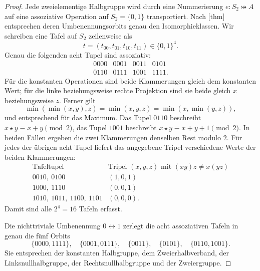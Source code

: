 \documentclass[main.tex]{subfiles}
\begin{document}
\begin{proof}
Jede zweielementige Halbgruppe wird durch eine Nummerierung
\(e\colon S_2\bij A\) auf eine assoziative Operation auf
\(S_2=\{0,1\}\) transportiert.  Nach
[thm]
entsprechen deren Umbenennungsorbits genau den Isomorphieklassen.
Wir schreiben eine Tafel auf \(S_2\) zeilenweise als
\[
  t=(t_{00},t_{01},t_{10},t_{11})\in\{0,1\}^{4}.
\]
Genau die folgenden acht Tupel sind assoziativ:
\[
\begin{array}{cccc}
0000&0001&0011&0101\\
0110&0111&1001&1111.
\end{array}
\]
Für die konstanten Operationen sind beide Klammerungen gleich dem konstanten
Wert; für die linke beziehungsweise rechte Projektion sind sie beide gleich
\(x\) beziehungsweise \(z\).  Ferner gilt
\[
  \min(\min(x,y),z)=\min(x,y,z)=\min(x,\min(y,z)),
\]
und entsprechend für das Maximum.  Das Tupel \(0110\) beschreibt
\(x\star y\equiv x+y\pmod2\), das Tupel \(1001\) beschreibt
\(x\star y\equiv x+y+1\pmod2\).  In beiden Fällen ergeben die zwei
Klammerungen denselben Rest modulo \(2\).
Für jedes der übrigen acht Tupel liefert das angegebene Tripel verschiedene
Werte der beiden Klammerungen:
\[
\begin{array}{c|c}
\text{Tafeltupel}&\text{Tripel }(x,y,z)\text{ mit }(xy)z\neq x(yz)\\
\hline
0010,\ 0100&(1,0,1)\\
1000,\ 1110&(0,0,1)\\
1010,\ 1011,\ 1100,\ 1101&(0,0,0).
\end{array}
\]
Damit sind alle \(2^4=16\) Tafeln erfasst.

Die nichttriviale Umbenennung \(0\leftrightarrow1\) zerlegt die acht
assoziativen Tafeln in genau die fünf Orbits
\[
\{0000,1111\},\quad
\{0001,0111\},\quad
\{0011\},\quad
\{0101\},\quad
\{0110,1001\}.
\]
Sie entsprechen der konstanten Halbgruppe, dem Zweierhalbverband, der
Linksnullhalbgruppe, der Rechtsnullhalbgruppe und der Zweiergruppe.


\end{proof}
\end{document}
